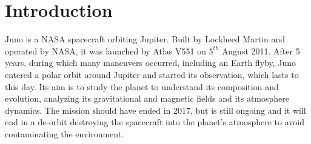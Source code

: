 \section{Introduction}
\label{sec:introduction}

Juno is a NASA spacecraft orbiting Jupiter. Built by Lockheed Martin and operated by NASA, it was launched by Atlas V551 on $5^{th}$ August 2011. After 5 years, during which many maneuvers occurred, including an Earth flyby, Juno entered a polar orbit around Jupiter and started its observation, which lasts to this day. Its aim is to study the planet to understand its composition and evolution, analyzing its gravitational and magnetic fields and its atmosphere dynamics. The mission should have ended in 2017, but is still ongoing and it will end in a de-orbit destroying the spacecraft into the planet's atmosphere to avoid contaminating the environment. 